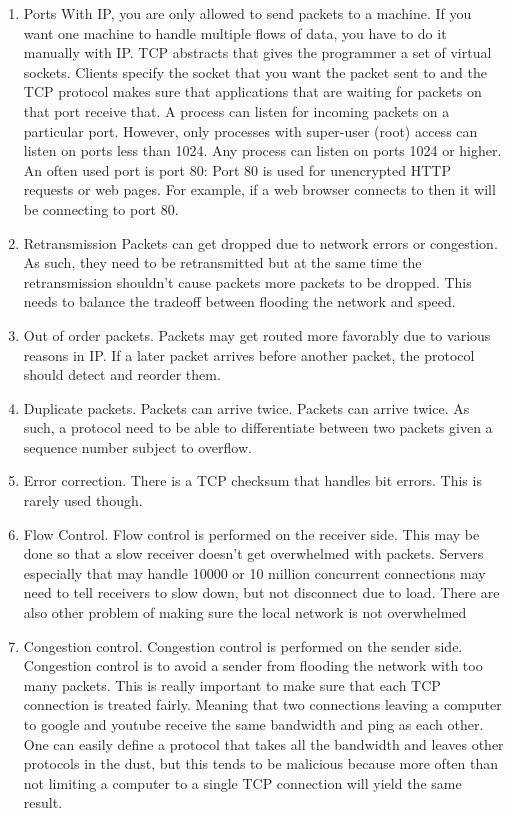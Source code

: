 \begin{enumerate}
  \item \gls{Ports}
  With IP, you are only allowed to send packets to a machine.
  If you want one machine to handle multiple flows of data, you have to do it manually with IP.
  TCP abstracts that gives the programmer a set of virtual sockets.
  Clients specify the socket that you want the packet sent to and the TCP protocol makes sure that applications that are waiting for packets on that port receive that.
  A process can listen for incoming packets on a particular port.
  However, only processes with \gls{super-user} (root) access can listen on ports less than 1024.
  Any process can listen on ports 1024 or higher.
  An often used port is port 80: Port 80 is used for unencrypted HTTP requests or web pages.
  For example, if a web browser connects to  then it will be connecting to port 80.

\item \gls{Retransmission}
  Packets can get dropped due to network errors or congestion.
  As such, they need to be retransmitted but at the same time the retransmission shouldn't cause packets more packets to be dropped.
  This needs to balance the tradeoff between flooding the network and speed.

\item Out of order packets.
  Packets may get routed more favorably due to various reasons in IP.
  If a later packet arrives before another packet, the protocol should detect and reorder them.

\item Duplicate packets.
  Packets can arrive twice.
  Packets can arrive twice.
  As such, a protocol need to be able to differentiate between two packets given a sequence number subject to overflow.

\item Error correction.
  There is a TCP checksum that handles bit errors.
  This is rarely used though.

\item Flow Control.
  Flow control is performed on the receiver side.
  This may be done so that a slow receiver doesn't get overwhelmed with packets.
  Servers especially that may handle 10000 or 10 million concurrent connections may need to tell receivers to slow down, but not disconnect due to load.
  There are also other problem of making sure the local network is not overwhelmed

\item Congestion control.
  Congestion control is performed on the sender side.
  Congestion control is to avoid a sender from flooding the network with too many packets.
  This is really important to make sure that each TCP connection is treated fairly.
  Meaning that two connections leaving a computer to google and youtube receive the same bandwidth and ping as each other.
  One can easily define a protocol that takes all the bandwidth and leaves other protocols in the dust, but this tends to be malicious because more often than not limiting a computer to a single TCP connection will yield the same result.


\end{enumerate}

